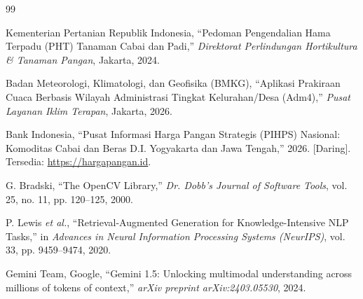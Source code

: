 \documentclass[11pt,a4paper]{article}
\begin{document}
\begin{thebibliography}{99}

Kementerian Pertanian Republik Indonesia, ``Pedoman Pengendalian Hama Terpadu (PHT) Tanaman Cabai dan Padi,'' \textit{Direktorat Perlindungan Hortikultura \& Tanaman Pangan}, Jakarta, 2024.

Badan Meteorologi, Klimatologi, dan Geofisika (BMKG), ``Aplikasi Prakiraan Cuaca Berbasis Wilayah Administrasi Tingkat Kelurahan/Desa (Adm4),'' \textit{Pusat Layanan Iklim Terapan}, Jakarta, 2026.

Bank Indonesia, ``Pusat Informasi Harga Pangan Strategis (PIHPS) Nasional: Komoditas Cabai dan Beras D.I. Yogyakarta dan Jawa Tengah,'' 2026. [Daring]. Tersedia: \url{https://hargapangan.id}.

G. Bradski, ``The OpenCV Library,'' \textit{Dr. Dobb's Journal of Software Tools}, vol. 25, no. 11, pp. 120--125, 2000.

P. Lewis \textit{et al.}, ``Retrieval-Augmented Generation for Knowledge-Intensive NLP Tasks,'' in \textit{Advances in Neural Information Processing Systems (NeurIPS)}, vol. 33, pp. 9459--9474, 2020.

Gemini Team, Google, ``Gemini 1.5: Unlocking multimodal understanding across millions of tokens of context,'' \textit{arXiv preprint arXiv:2403.05530}, 2024.

\end{thebibliography}
\end{document}

